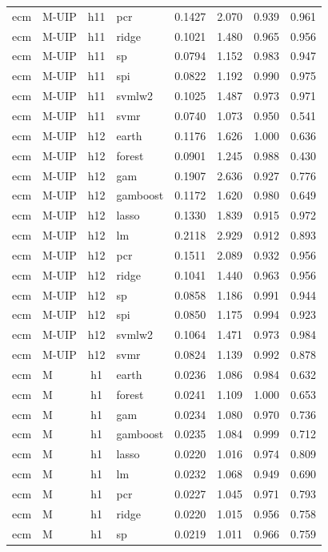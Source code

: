 \begin{ThreePartTable}
\begin{longtable}[t]{llclcccc}
ecm & M-UIP & h11 & pcr & 0.1427 & 2.070 & 0.939 & 0.961\\
ecm & M-UIP & h11 & ridge & 0.1021 & 1.480 & 0.965 & 0.956\\
ecm & M-UIP & h11 & sp & 0.0794 & 1.152 & 0.983 & 0.947\\
ecm & M-UIP & h11 & spi & 0.0822 & 1.192 & 0.990 & 0.975\\
ecm & M-UIP & h11 & svmlw2 & 0.1025 & 1.487 & 0.973 & 0.971\\
ecm & M-UIP & h11 & svmr & 0.0740 & 1.073 & 0.950 & 0.541\\
\addlinespace
ecm & M-UIP & h12 & earth & 0.1176 & 1.626 & 1.000 & 0.636\\
ecm & M-UIP & h12 & forest & 0.0901 & 1.245 & 0.988 & 0.430\\
ecm & M-UIP & h12 & gam & 0.1907 & 2.636 & 0.927 & 0.776\\
ecm & M-UIP & h12 & gamboost & 0.1172 & 1.620 & 0.980 & 0.649\\
ecm & M-UIP & h12 & lasso & 0.1330 & 1.839 & 0.915 & 0.972\\
ecm & M-UIP & h12 & lm & 0.2118 & 2.929 & 0.912 & 0.893\\
ecm & M-UIP & h12 & pcr & 0.1511 & 2.089 & 0.932 & 0.956\\
ecm & M-UIP & h12 & ridge & 0.1041 & 1.440 & 0.963 & 0.956\\
ecm & M-UIP & h12 & sp & 0.0858 & 1.186 & 0.991 & 0.944\\
ecm & M-UIP & h12 & spi & 0.0850 & 1.175 & 0.994 & 0.923\\
ecm & M-UIP & h12 & svmlw2 & 0.1064 & 1.471 & 0.973 & 0.984\\
ecm & M-UIP & h12 & svmr & 0.0824 & 1.139 & 0.992 & 0.878\\
\addlinespace
ecm & M & h1 & earth & 0.0236 & 1.086 & 0.984 & 0.632\\
ecm & M & h1 & forest & 0.0241 & 1.109 & 1.000 & 0.653\\
ecm & M & h1 & gam & 0.0234 & 1.080 & 0.970 & 0.736\\
ecm & M & h1 & gamboost & 0.0235 & 1.084 & 0.999 & 0.712\\
ecm & M & h1 & lasso & 0.0220 & 1.016 & 0.974 & 0.809\\
ecm & M & h1 & lm & 0.0232 & 1.068 & 0.949 & 0.690\\
ecm & M & h1 & pcr & 0.0227 & 1.045 & 0.971 & 0.793\\
ecm & M & h1 & ridge & 0.0220 & 1.015 & 0.956 & 0.758\\
ecm & M & h1 & sp & 0.0219 & 1.011 & 0.966 & 0.759\\

\end{longtable}
\end{ThreePartTable}
